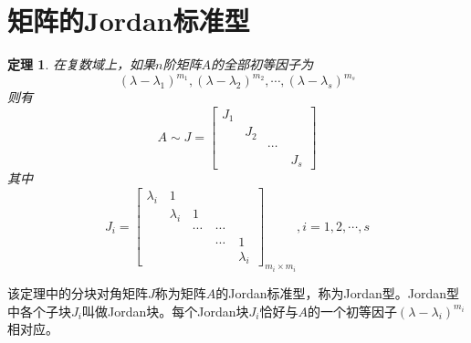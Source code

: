 \documentclass[a4paper,11pt]{article}
\newtheorem{theorem}{\hspace{2em}定理}[section]
\begin{document}
    \section{矩阵的Jordan标准型}
    \begin{theorem}
        在复数域上，如果$n$阶矩阵$A$的全部初等因子为
        \begin{equation*}
            (\lambda-\lambda_1)^{m_1},(\lambda-\lambda_2)^{m_2},\cdots,(\lambda-\lambda_s)^{m_s}
        \end{equation*}
        则有
        \begin{equation*}
            A\sim J=\begin{bmatrix}
                J_1&\quad&\quad&\quad\\
                \quad&J_2&\quad&\quad\\
                \quad&\quad&\cdots&\quad\\
                \quad&\quad&\quad&J_s
            \end{bmatrix}
        \end{equation*}
        其中
        \begin{equation*}
            J_i=\begin{bmatrix}
                \lambda_i&1&\quad&\quad&\quad\\
                \quad&\lambda_i&1&\quad&\quad\\
                \quad&\quad&\cdots&\cdots&\quad\\
                \quad&\quad&\quad&\cdots&1\\
                \quad&\quad&\quad&\quad&\lambda_i
            \end{bmatrix}_{m_i\times m_i},i=1,2,\cdots,s
        \end{equation*}
    \end{theorem}
    该定理中的分块对角矩阵$J$称为矩阵$A$的Jordan标准型，称为Jordan型。Jordan型中各个子块$J_i$叫做Jordan块。每个Jordan块$J_i$恰好与$A$的一个初等因子$(\lambda-\lambda_i)^{m_i}$相对应。
\end{document}
